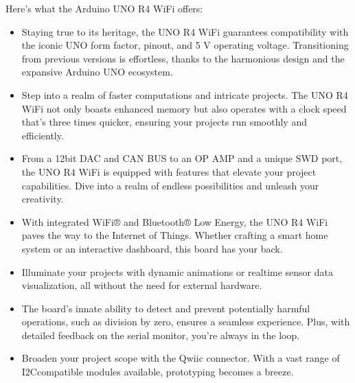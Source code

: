 \documentclass[a4paper,11pt,english]{sphinxmanual}
\begin{document}
\sphinxAtStartPar
Here’s what the Arduino UNO R4 WiFi offers:
\begin{itemize}
\item {} 
\sphinxAtStartPar
{} Staying true to its heritage, the UNO R4 WiFi guarantees compatibility with the iconic UNO form factor, pinout, and 5 V operating voltage. Transitioning from previous versions is effortless, thanks to the harmonious design and the expansive Arduino UNO ecosystem.

\item {} 
\sphinxAtStartPar
{} Step into a realm of faster computations and intricate projects. The UNO R4 WiFi not only boasts enhanced memory but also operates with a clock speed that’s three times quicker, ensuring your projects run smoothly and efficiently.

\item {} 
\sphinxAtStartPar
{} From a 12\sphinxhyphen{}bit DAC and CAN BUS to an OP AMP and a unique SWD port, the UNO R4 WiFi is equipped with features that elevate your project capabilities. Dive into a realm of endless possibilities and unleash your creativity.

\item {} 
\sphinxAtStartPar
{} With integrated Wi\sphinxhyphen{}Fi® and Bluetooth® Low Energy, the UNO R4 WiFi paves the way to the Internet of Things. Whether crafting a smart home system or an interactive dashboard, this board has your back.

\item {} 
\sphinxAtStartPar
{} Illuminate your projects with dynamic animations or real\sphinxhyphen{}time sensor data visualization, all without the need for external hardware.

\item {} 
\sphinxAtStartPar
{} The board’s innate ability to detect and prevent potentially harmful operations, such as division by zero, ensures a seamless experience. Plus, with detailed feedback on the serial monitor, you’re always in the loop.

\item {} 
\sphinxAtStartPar
{} Broaden your project scope with the Qwiic connector. With a vast range of I2C\sphinxhyphen{}compatible modules available, prototyping becomes a breeze.

\end{itemize}
\end{document}
